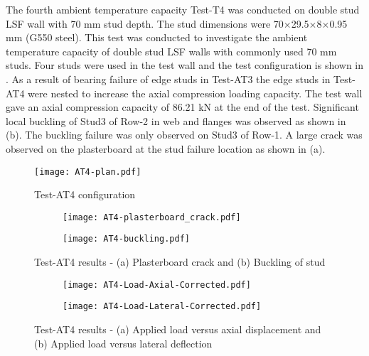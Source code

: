 The fourth ambient temperature capacity Test-T4 was conducted on double stud LSF wall with 70 mm stud depth. The stud dimensions were 70$\times$29.5$\times$8$\times$0.95 mm (G550 steel). This test was conducted to investigate the ambient temperature capacity of double stud LSF walls with commonly used 70 mm studs. Four studs were used in the test wall and the test configuration is shown in . As a result of bearing failure of edge studs in Test-AT3 the edge studs in Test-AT4 were nested to increase the axial compression loading capacity. The test wall gave an axial compression capacity of 86.21 kN at the end of the test. Significant local buckling of Stud3 of Row-2 in web and flanges was observed as shown in  (b). The buckling failure was only observed on Stud3 of Row-1. A large crack was observed on the plasterboard at the stud failure location as shown in  (a).
\begin{figure}[!htbp]
	\centering
			\texttt{[image: AT4-plan.pdf]}\\
		\caption{Test-AT4 configuration}
		\label{fig:AT4-plan}
\end{figure}  
\begin{figure}[!htbp]
	\centering
	\begin{subfigure}[b]{0.3\textwidth}
		\centering
		\texttt{[image: AT4-plasterboard\_crack.pdf]}
		\caption{}
		\label{subfig:AT4-plasterboard_crack}
	\end{subfigure}
	\begin{subfigure}[b]{0.3\textwidth}
		\centering
		\texttt{[image: AT4-buckling.pdf]}
		\caption{}
		\label{subfig:AT4-buckling}
	\end{subfigure}
	   \caption{Test-AT4 results - (a) Plasterboard crack and (b) Buckling of stud}
	   \label{fig:AT4-failure}
\end{figure}
\begin{figure}[!htbp]
	\centering
	\begin{subfigure}[b]{0.7\textwidth}
		\centering
		\texttt{[image: AT4-Load-Axial-Corrected.pdf]}
		\caption{}
		\label{subfig:AT4-Load-Axial-Corrected}
	\end{subfigure}
	\begin{subfigure}[b]{0.7\textwidth}
		\centering
		\texttt{[image: AT4-Load-Lateral-Corrected.pdf]}
		\caption{}
		\label{subfig:AT4-Load-Lateral-Corrected}
	\end{subfigure}
	   \caption{Test-AT4 results - (a) Applied load versus axial displacement and (b) Applied load versus lateral deflection}
	   \label{fig:AT4-results}
\end{figure}

